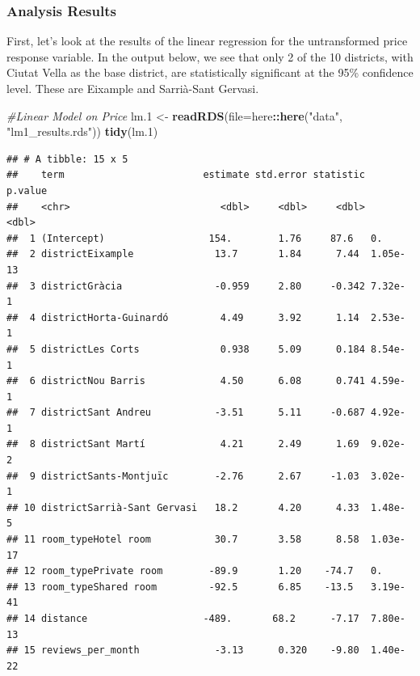 \documentclass[]{article}
\newenvironment{Shaded}{\begin{snugshade}}{\end{snugshade}}
\newcommand{\CommentTok}[1]{\textcolor[rgb]{0.56,0.35,0.01}{\textit{#1}}}
\newcommand{\DataTypeTok}[1]{\textcolor[rgb]{0.13,0.29,0.53}{#1}}
\newcommand{\FloatTok}[1]{\textcolor[rgb]{0.00,0.00,0.81}{#1}}
\newcommand{\KeywordTok}[1]{\textcolor[rgb]{0.13,0.29,0.53}{\textbf{#1}}}
\newcommand{\NormalTok}[1]{#1}
\newcommand{\OperatorTok}[1]{\textcolor[rgb]{0.81,0.36,0.00}{\textbf{#1}}}
\newcommand{\StringTok}[1]{\textcolor[rgb]{0.31,0.60,0.02}{#1}}
\begin{document}
\hypertarget{analysis-results}{%
\subsubsection{Analysis Results}\label{analysis-results}}

First, let's look at the results of the linear regression for the
untransformed price response variable. In the output below, we see that
only 2 of the 10 districts, with Ciutat Vella as the base district, are
statistically significant at the 95\% confidence level. These are
Eixample and Sarrià-Sant Gervasi.

\begin{Shaded}
\begin{Highlighting}[]
\CommentTok{#Linear Model on Price}
\NormalTok{lm}\FloatTok{.1}\NormalTok{ <-}\StringTok{ }\KeywordTok{readRDS}\NormalTok{(}\DataTypeTok{file=}\NormalTok{here}\OperatorTok{::}\KeywordTok{here}\NormalTok{(}\StringTok{"data"}\NormalTok{, }\StringTok{"lm1_results.rds"}\NormalTok{))}
\KeywordTok{tidy}\NormalTok{(lm}\FloatTok{.1}\NormalTok{)}
\end{Highlighting}
\end{Shaded}

\begin{verbatim}
## # A tibble: 15 x 5
##    term                        estimate std.error statistic  p.value
##    <chr>                          <dbl>     <dbl>     <dbl>    <dbl>
##  1 (Intercept)                  154.        1.76     87.6   0.      
##  2 districtEixample              13.7       1.84      7.44  1.05e-13
##  3 districtGràcia                -0.959     2.80     -0.342 7.32e- 1
##  4 districtHorta-Guinardó         4.49      3.92      1.14  2.53e- 1
##  5 districtLes Corts              0.938     5.09      0.184 8.54e- 1
##  6 districtNou Barris             4.50      6.08      0.741 4.59e- 1
##  7 districtSant Andreu           -3.51      5.11     -0.687 4.92e- 1
##  8 districtSant Martí             4.21      2.49      1.69  9.02e- 2
##  9 districtSants-Montjuïc        -2.76      2.67     -1.03  3.02e- 1
## 10 districtSarrià-Sant Gervasi   18.2       4.20      4.33  1.48e- 5
## 11 room_typeHotel room           30.7       3.58      8.58  1.03e-17
## 12 room_typePrivate room        -89.9       1.20    -74.7   0.      
## 13 room_typeShared room         -92.5       6.85    -13.5   3.19e-41
## 14 distance                    -489.       68.2      -7.17  7.80e-13
## 15 reviews_per_month             -3.13      0.320    -9.80  1.40e-22
\end{verbatim}
\end{document}
